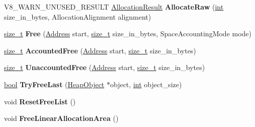 \begin{DoxyCompactItemize}
\item 
\mbox{\label{classv8_1_1internal_1_1PagedSpace_a190586880dfb86739d285b2f8ae4ad69}} 
V8\+\_\+\+W\+A\+R\+N\+\_\+\+U\+N\+U\+S\+E\+D\+\_\+\+R\+E\+S\+U\+LT \mbox{\hyperlink{classv8_1_1internal_1_1AllocationResult}{Allocation\+Result}} {\bfseries Allocate\+Raw} (\mbox{\hyperlink{classint}{int}} size\+\_\+in\+\_\+bytes, Allocation\+Alignment alignment)
\item 
\mbox{\label{classv8_1_1internal_1_1PagedSpace_a6ae7376fb39c9605bd24a844d5db6b19}} 
\mbox{\hyperlink{classsize__t}{size\+\_\+t}} {\bfseries Free} (\mbox{\hyperlink{classuintptr__t}{Address}} start, \mbox{\hyperlink{classsize__t}{size\+\_\+t}} size\+\_\+in\+\_\+bytes, Space\+Accounting\+Mode mode)
\item 
\mbox{\label{classv8_1_1internal_1_1PagedSpace_af4cc6101fadace16a2020a79ff40d4ff}} 
\mbox{\hyperlink{classsize__t}{size\+\_\+t}} {\bfseries Accounted\+Free} (\mbox{\hyperlink{classuintptr__t}{Address}} start, \mbox{\hyperlink{classsize__t}{size\+\_\+t}} size\+\_\+in\+\_\+bytes)
\item 
\mbox{\label{classv8_1_1internal_1_1PagedSpace_aa23445ba81fe8a4450d210da27c43171}} 
\mbox{\hyperlink{classsize__t}{size\+\_\+t}} {\bfseries Unaccounted\+Free} (\mbox{\hyperlink{classuintptr__t}{Address}} start, \mbox{\hyperlink{classsize__t}{size\+\_\+t}} size\+\_\+in\+\_\+bytes)
\item 
\mbox{\label{classv8_1_1internal_1_1PagedSpace_ad59e58750cc6107fd5be2845b712685a}} 
\mbox{\hyperlink{classbool}{bool}} {\bfseries Try\+Free\+Last} (\mbox{\hyperlink{classv8_1_1internal_1_1HeapObject}{Heap\+Object}} $\ast$object, \mbox{\hyperlink{classint}{int}} object\+\_\+size)
\item 
\mbox{\label{classv8_1_1internal_1_1PagedSpace_a717b2939aec984ef6c6517c3195b0923}} 
void {\bfseries Reset\+Free\+List} ()
\item 
\mbox{\label{classv8_1_1internal_1_1PagedSpace_a5fd0a215647d1fb8761e73d24300aa44}} 
void {\bfseries Free\+Linear\+Allocation\+Area} ()

\end{DoxyCompactItemize}
